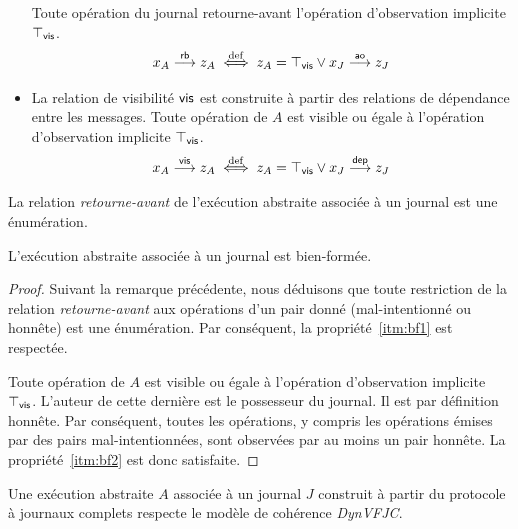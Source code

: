 \begin{definition}
\begin{itemize}
Toute opération du journal retourne-avant l'opération d'observation implicite $\top_{\operatorname{\mathsf{vis}}}$.
\begin{equation*}
    x_A \overset{\mathsf{rb}}{\longrightarrow} z_A \overset{\mathrm{def}}{\iff} z_A = \top_{\operatorname{\mathsf{vis}}} \lor x_J \overset{\mathsf{ao}}{\longrightarrow} z_J
\end{equation*}
\item La relation de visibilité $\operatorname{\mathsf{vis}}$ est construite à partir des relations de dépendance entre les messages.
Toute opération de $A$ est visible ou égale à l'opération d'observation implicite $\top_{\operatorname{\mathsf{vis}}}$.
\begin{equation*}
    x_A \overset{\mathsf{vis}}{\longrightarrow} z_A \overset{\mathrm{def}}{\iff} z_A = \top_{\operatorname{\mathsf{vis}}} \lor x_J \overset{\mathsf{dep}}{\longrightarrow} z_J
\end{equation*}
\end{itemize}
\end{definition}


\begin{remark}
La relation \emph{retourne-avant} de l'exécution abstraite associée à un journal est une énumération.
\end{remark}

\begin{proposition}
L'exécution abstraite associée à un journal est bien-formée.
\end{proposition}

\begin{proof}
Suivant la remarque précédente, nous déduisons que toute restriction de la relation \emph{retourne-avant} aux opérations d'un pair donné (mal-intentionné ou honnête) est une énumération.
Par conséquent, la propriété~\ref{itm:bf1} est respectée.

Toute opération de $A$ est visible ou égale à l'opération d'observation implicite $\top_{\operatorname{\mathsf{vis}}}$.
L'auteur de cette dernière est le possesseur du journal.
Il est par définition honnête.
Par conséquent, toutes les opérations, y compris les opérations émises par des pairs mal-intentionnées, sont observées par au moins un pair honnête.
La propriété~\ref{itm:bf2} est donc satisfaite.
\end{proof}

\begin{theorem}
Une exécution abstraite $A$ associée à un journal $J$ construit à partir du protocole à journaux complets respecte le modèle de cohérence \emph{DynVFJC}.
\end{theorem}

